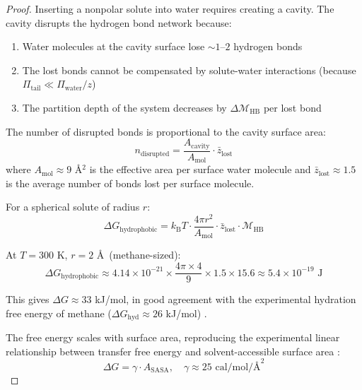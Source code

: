 \documentclass[twocolumn,10pt]{article}
\theoremstyle{remark}
\newcommand{\kB}{k_{\mathrm{B}}}
\newcommand{\Depth}{\mathcal{M}}
\begin{document}
\begin{proof}
Inserting a nonpolar solute into water requires creating a cavity. The cavity disrupts the hydrogen bond network because:
\begin{enumerate}
    \item Water molecules at the cavity surface lose $\sim 1$--$2$ hydrogen bonds
    \item The lost bonds cannot be compensated by solute-water interactions (because $\Pi_{\text{tail}} \ll \Pi_{\text{water}}/z$)
    \item The partition depth of the system decreases by $\Delta\Depth_{\text{HB}}$ per lost bond
\end{enumerate}

The number of disrupted bonds is proportional to the cavity surface area:
\begin{equation}
    n_{\text{disrupted}} = \frac{A_{\text{cavity}}}{A_{\text{mol}}} \cdot \bar{z}_{\text{lost}}
\end{equation}
where $A_{\text{mol}} \approx 9$ \AA$^2$ is the effective area per surface water molecule and $\bar{z}_{\text{lost}} \approx 1.5$ is the average number of bonds lost per surface molecule.

For a spherical solute of radius $r$:
\begin{equation}
    \Delta G_{\text{hydrophobic}} = \kB T \cdot \frac{4\pi r^2}{A_{\text{mol}}} \cdot \bar{z}_{\text{lost}} \cdot \Depth_{\text{HB}}
\end{equation}

At $T = 300$ K, $r = 2$ \AA\ (methane-sized):
\begin{equation}
    \Delta G_{\text{hydrophobic}} \approx 4.14 \times 10^{-21} \times \frac{4\pi \times 4}{9} \times 1.5 \times 15.6 \approx 5.4 \times 10^{-19} \text{ J}
\end{equation}

This gives $\Delta G \approx 33$ kJ/mol, in good agreement with the experimental hydration free energy of methane ($\Delta G_{\text{hyd}} \approx 26$ kJ/mol) \cite{ben-naim1987,abraham1984}.

The free energy scales with surface area, reproducing the experimental linear relationship between transfer free energy and solvent-accessible surface area \cite{reynolds1974,sharp1991}:
\begin{equation}
    \Delta G = \gamma \cdot A_{\text{SASA}}, \quad \gamma \approx 25 \text{ cal/mol/\AA}^2
\end{equation}
\end{proof}
\end{document}
